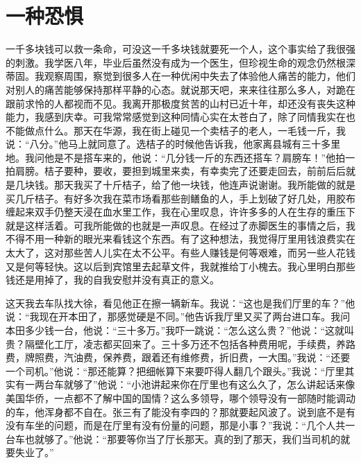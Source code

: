 \documentclass[12pt,oneside]{book}
\begin{document}
\chapter{一种恐惧}

一千多块钱可以救一条命，可没这一千多块钱就要死一个人，这个事实给了我很强的刺激。我学医八年，毕业后虽然没有成为一个医生，但珍视生命的观念仍然根深蒂固。我观察周围，察觉到很多人在一种优闲中失去了体验他人痛苦的能力，他们对别人的痛苦能够保持那样平静的心态。就说那天吧，来来往往那么多人，对跪在跟前求怜的人都视而不见。我离开那极度贫苦的山村已近十年，却还没有丧失这种能力，我感到庆幸。可我常常感觉到这种同情心实在太苍白了，除了同情我实在也不能做点什么。那天在华源，我在街上碰见一个卖桔子的老人，一毛钱一斤，我说：``八分。''他马上就同意了。选桔子的时候他告诉我，他家离县城有三十多里地。我问他是不是搭车来的，他说：``几分钱一斤的东西还搭车？肩膀车！''他拍一拍肩膀。桔子要种，要收，要担到城里来卖，有幸卖完了还要走回去，前前后后就是几块钱。那天我买了十斤桔子，给了他一块钱，他连声说谢谢。我所能做的就是买几斤桔子。有好多次我在菜市场看那些剖鳝鱼的人，手上划破了好几处，用胶布缠起来双手仍整天浸在血水里工作，我在心里叹息，许许多多的人在生存的重压下就是这样活着。可我所能做的也就是一声叹息。在经过了赤脚医生的事情之后，我不得不用一种新的眼光来看钱这个东西。有了这种想法，我觉得厅里用钱浪费实在太大了，这对那些苦人儿实在太不公平。有些人赚钱是何等艰难，而另一些人花钱又是何等轻快。这以后到宾馆里去起草文件，我就推给丁小槐去。我心里明白那些钱还是用掉了，我的自我安慰并没有真正的意义。

这天我去车队找大徐，看见他正在擦一辆新车。我说：``这也是我们厅里的车？''他说：``我现在开本田了，那感觉硬是不同。''他告诉我厅里又买了两台进口车。我问本田多少钱一台，他说：``三十多万。''我吓一跳说：``怎么这么贵？''他说：``这就叫贵？隔壁化工厅，凌志都买回来了。三十多万还不包括各种费用呢，手续费，养路费，牌照费，汽油费，保养费，跟着还有维修费，折旧费，一大围。''我说：``还要一个司机。''他说：``那还能算？把细帐算下来要吓得人翻几个跟头。''我说：``厅里其实有一两台车就够了''他说：``小池讲起来你在厅里也有这么久了，怎么讲起话来像美国华侨，一点都不了解中国的国情？这么多领导，哪个领导没有一部随时能调动的车，他浑身都不自在。张三有了能没有李四的？那就要起风波了。说到底不是有没有车坐的问题，而是在厅里有没有份量的问题，那是小事？''我说：``几个人共一台车也就够了。''他说：``那要等你当了厅长那天。真的到了那天，我们当司机的就要失业了。''
\end{document}
